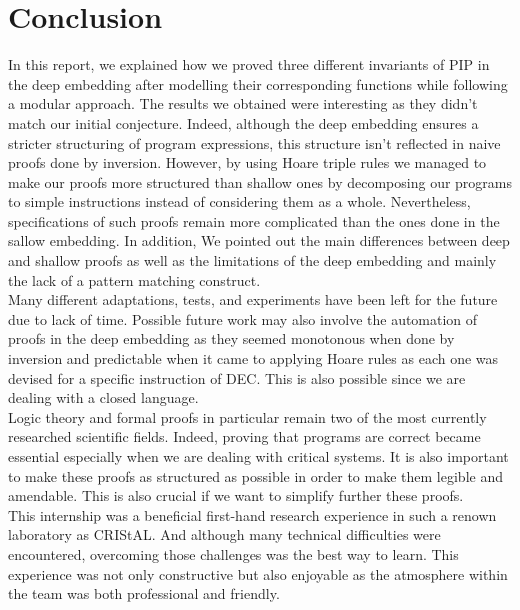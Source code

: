 \chapter{Conclusion}
In this report, we explained how we proved three different invariants of PIP in the deep embedding after modelling their corresponding functions while following a modular approach. The results we obtained were interesting as they didn't match our initial conjecture. Indeed, although the deep embedding ensures a stricter structuring of program expressions, this structure isn't reflected in naive proofs done by inversion. However, by using Hoare triple rules we managed to make our proofs more structured than shallow ones by decomposing our programs to simple instructions instead of considering them as a whole. Nevertheless, specifications of such proofs remain more complicated than the ones done in the sallow embedding. In addition, We pointed out the main differences between deep and shallow proofs as well as the limitations of the deep embedding and mainly the lack of a pattern matching construct. \\

Many different adaptations, tests, and experiments have been left for the future due to lack of time. Possible future work may also involve the automation of proofs in the deep embedding as they seemed monotonous when done by inversion and predictable when it came to applying Hoare rules as each one was devised for a specific instruction of DEC. This is also possible since we are dealing with a closed language. \\

Logic theory and formal proofs in particular remain two of the most currently researched scientific fields. Indeed, proving that programs are correct became essential especially when we are dealing with critical systems. It is also important to make these proofs as structured as possible in order to make them legible and amendable. This is also crucial if we want to simplify further these proofs.  \\   

This internship was a beneficial first-hand research experience in such a renown laboratory as CRIStAL. And although many technical difficulties were encountered, overcoming those challenges was the best way to learn. This experience was not only  constructive but also enjoyable as the atmosphere within the team was both professional and friendly. \\ 